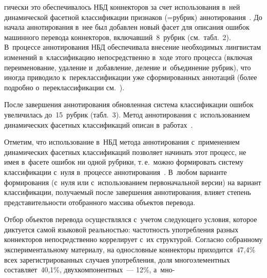 \begin{multicols}{2}
\columnbreak

\noindent
гически это 
обеспечивалось НБД коннекторов за счет использования в~ней динамической 
фасетной классификации признаков (=\;рубрик) аннотирования~\cite{17-gz, 18-gz, 19-gz}. 
До  начала аннотирования в~нее был добавлен новый фасет для описания ошибок 
машинного перевода коннекторов, включавший~8~руб\-рик (см.\ табл.~2). 
В~процессе аннотирования НБД обеспечивала внесение необходимых 
лингвистам изменений в~классификацию непосредственно в~ходе этого 
процесса (включая переименование, удаление и~добавление, деление 
и~объединение руб\-рик), что иногда приводило к~переклассификации уже 
сформированных аннотаций (более подробно о~переклассификации см.~\cite{20-gz}).
  
  После завершения аннотирования обновленная система классификации 
ошибок увеличилась до~15~рубрик (табл.~3). Метод аннотирования 
с~использованием динамических фасетных классификаций описан 
в~работах~\cite{17-gz, 19-gz, 21-gz}.


  
  Отметим, что использование в~НБД метода аннотирования с~применением 
динамических фасетных классификаций позволяет начинать этот процесс, не 
имея в~фасете ошибок ни одной рубрики, т.\,е.\ можно формировать систему 
классификации с~нуля в~процессе аннотирования~\cite{22-gz}. В~любом\linebreak 
варианте формирования (с~нуля или с~исполь\-зо\-ванием первоначальной версии) 
на вариант клас\-сификации, получаемый после завершения ан\-нотирования, 
влияет степень представительности отобранного массива объектов перевода.
  
  Отбор объектов перевода осуществлялся с~учетом следующего условия, 
которое диктуется самой языковой реальностью: частотность употребления 
разных коннекторов непосредственно коррелирует с~их структурой. 
Согласно 
собранному экспериментальному материалу, на однословные коннекторы 
приходится~47,4\% всех зарегистрированных
случаев употребления, доля 
многоэлементных составляет~40,1\%, двухкомпонентных~--- 12\%, 
а~мно-\linebreak\vspace*{-12pt}

\end{multicols}

